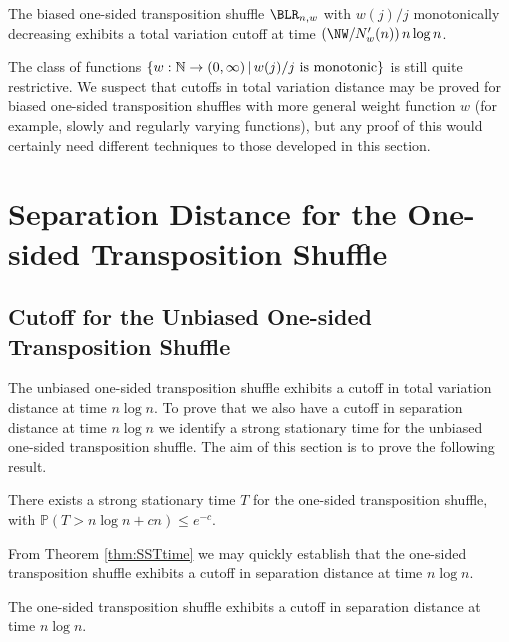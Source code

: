 \documentclass[11pt]{report}
\begin{document}
\begin{conj}
	The biased one-sided transposition shuffle $\BLR_{n,w}$ with $w(j)/j$  monotonically decreasing  exhibits a total variation cutoff at time $\left(\NW / N_{w}^{\prime}(n) \right) n\log n$. 
\end{conj}

The class of functions $\{w:\mathbb{N} \to (0,\infty) \, | \,  w(j)/j \textnormal{ is monotonic}\}$ is still quite restrictive. We suspect that cutoffs in total variation distance may be proved for biased one-sided transposition shuffles with more general weight function $w$ (for example, slowly and regularly varying functions), but any proof of this would certainly need different techniques to those developed in this section.





\section{Separation Distance for the One-sided Transposition Shuffle}
\label{chpt5:sec:separation}
\subsection{Cutoff for the Unbiased One-sided Transposition Shuffle}



The unbiased one-sided transposition 
shuffle exhibits a cutoff in total variation distance at time $n\log n$. To prove that we also have a cutoff in separation distance at time $n\log n$ we identify a strong stationary time for the unbiased one-sided transposition shuffle. The aim of this section is to prove the following result.
\begin{thm}
	\label{thm:SSTtime}
	There exists a strong stationary time $T$ for the one-sided 
	transposition shuffle, with		
	$\mathbb{P}(T> n\log n + cn) \leq e^{-c}$.
\end{thm}

From Theorem \ref{thm:SSTtime} we may quickly establish that the one-sided transposition shuffle exhibits a cutoff in separation distance at time $n\log n$.


\begin{thm}
	\label{thm:sepcutoff}
	The one-sided transposition shuffle exhibits a cutoff in separation distance at time $n\log n$.
	
	
	
	
	
	
	
	
\end{thm}
\end{document}
